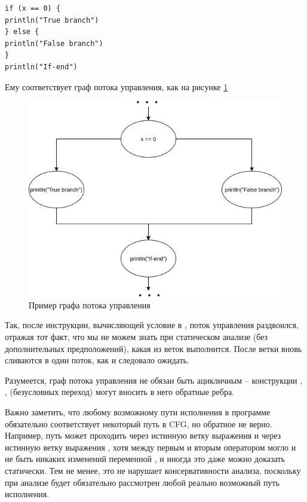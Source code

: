 \begin{verbatim}
if (x == 0) {
println("True branch")
} else {
println("False branch")
}
println("If-end")
\end{verbatim}

Ему соответствует граф потока управления, как на рисунке \ref{control-flow-example}

\begin{figure}
  \centering
  \includegraphics[scale=0.5]{img/control-flow-example}
  \caption{Пример графа потока управления}
  \label{control-flow-example}
\end{figure}


Так, после инструкции, вычисляющей условие в , поток управления раздвоился, отражая тот факт, что мы не можем знать при статическом анализе (без дополнительных предположений), какая из веток выполнится. После ветки вновь сливаются в один поток, как и следовало ожидать.

Разумеется, граф потока управления не обязан быть ацикличным -- конструкции , ,  (безусловных переход) могут вносить в него обратные ребра.

Важно заметить, что любому возможному пути исполнения в программе обязательно соответствует некоторый путь в CFG, но обратное не верно. Например, путь может проходить через истинную ветку выражения \linebreak {} и через истинную ветку выражения , хотя между первым и вторым оператором могло и не быть никаких изменений переменной , и иногда это даже можно доказать статически.
Тем не менее, это не нарушает консервативности анализа, поскольку при анализе будет обязательно рассмотрен любой реально возможный путь исполнения.

